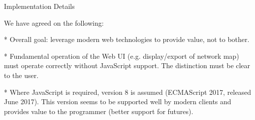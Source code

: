 \secc Implementation Details

We have agreed on the following:

\begitems

* Overall goal: leverage modern web technologies to provide value, not to bother.

* Fundamental operation of the Web UI (e.g. display/export of network map) must
operate correctly without JavaScript support. The distinction must be clear to
the user.

* Where JavaScript is required, version 8 is assumed (ECMAScript 2017, released
June 2017). This version seems to be supported well by modern clients and
provides value to the programmer (better support for futures).

\enditems

\bye
